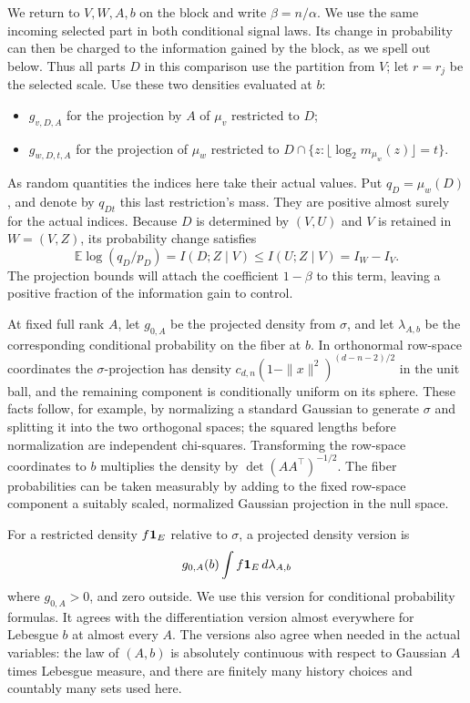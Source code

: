 We return to \(V,W,A,b\) on the block and write \(\beta=n/\alpha\).
We use the same incoming selected part in both conditional signal laws.
Its change in probability can then be charged to the information
gained by the block, as we spell out below. Thus all parts \(D\) in
this comparison use the partition from \(V\); let \(r=r_j\) be the
selected scale. Use these two densities evaluated at \(b\):
\begin{itemize}
\item \(g_{v,D,A}\) for the projection by \(A\) of \(\mu_v\) restricted to \(D\);
\item \(g_{w,D,t,A}\) for the projection of \(\mu_w\) restricted to \(D\cap\{z:\lfloor\log_2 m_{\mu_w}(z)\rfloor=t\}\).

\end{itemize}
As random quantities the indices here take their actual values. Put
\(q_D=\mu_w(D)\), and denote by \(q_{Dt}\) this last restriction's
mass. They are positive almost surely for the actual indices.
Because \(D\) is determined by \((V,U)\) and \(V\) is retained in
\(W=(V,Z)\), its probability change satisfies
\begin{equation}\label{lc:cell-mass-change}
 \mathbb E\log(q_D/p_D)=I(D;Z\mid V)
 \le I(U;Z\mid V)=I_W-I_V.
\end{equation}
The projection bounds will attach the coefficient \(1-\beta\) to
this term, leaving a positive fraction of the information gain to
control.

At fixed full rank \(A\), let \(g_{0,A}\) be the projected density
from \(\sigma\), and let \(\lambda_{A,b}\) be the corresponding
conditional probability on the fiber at \(b\). In orthonormal
row-space coordinates the \(\sigma\)-projection has density
\(c_{d,n}(1-\|x\|^2)^{(d-n-2)/2}\) in the unit ball, and the remaining
component is conditionally uniform on its sphere. These facts follow,
for example, by normalizing a standard Gaussian to generate \(\sigma\)
and splitting it into the two orthogonal spaces; the squared lengths
before normalization are independent chi-squares. Transforming the
row-space coordinates to \(b\) multiplies the density by
\(\det(AA^\top)^{-1/2}\). The fiber probabilities can be taken
measurably by adding to the fixed row-space component a suitably scaled,
normalized Gaussian projection in the null space.

For a restricted density \(f{\bf 1}_E\) relative to \(\sigma\), a
projected density version is
\[
 g_{0,A}(b)\int f{\bf 1}_E\,d\lambda_{A,b}
\]
where \(g_{0,A}>0\), and zero outside. We use this version for
conditional probability formulas. It agrees with the differentiation
version almost everywhere for Lebesgue \(b\) at almost every \(A\).
The versions also agree when needed in the actual variables: the law
of \((A,b)\) is absolutely continuous with respect to Gaussian \(A\)
times Lebesgue measure, and there are finitely many history choices
and countably many sets used here.

